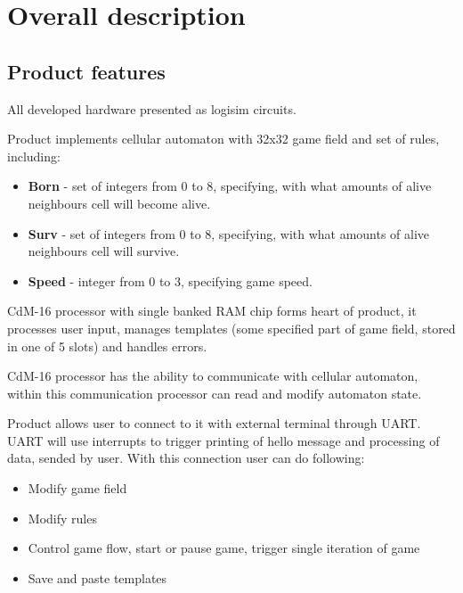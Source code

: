\chapter*{Overall description}

\section*{Product features}

All developed hardware presented as logisim circuits.

Product implements cellular automaton with 32x32 game field and set of rules, including:

\begin{itemize}
	\item \textbf{Born} - set of integers from 0 to 8, specifying, with what amounts of alive neighbours cell will become alive.
	\item \textbf{Surv} - set of integers from 0 to 8, specifying, with what amounts of alive neighbours cell will survive.
	\item \textbf{Speed} - integer from 0 to 3, specifying game speed.
\end{itemize}

CdM-16 processor with single banked RAM chip forms heart of product, it processes user input, manages templates (some specified part of game field, stored in one of 5 slots) and handles errors.

CdM-16 processor has the ability to communicate with cellular automaton, within this communication processor can read and modify automaton state.

Product allows user to connect to it with external terminal through UART. UART will use interrupts to trigger printing of hello message and processing of data, sended by user. With this connection user can do following:

\begin{itemize}
	\item Modify game field
	\item Modify rules
	\item Control game flow, start or pause game, trigger single iteration of game
	\item Save and paste templates
\end{itemize}

